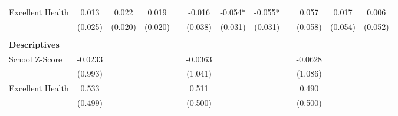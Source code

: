 \begin{table}[htpb!]
\begin{center}
{\begin{tabular}{lcccp{2mm}cccp{2mm}ccc}
Excellent Health&0.013&0.022&0.019&&-0.016&-0.054*&-0.055*&&0.057&0.017&0.006\\
&(0.025)&(0.020)&(0.020)&&(0.038)&(0.031)&(0.031)&&(0.058)&(0.054)&(0.052)\\
\begin{footnotesize}\end{footnotesize}&\begin{footnotesize}\end{footnotesize}&\begin{footnotesize}\end{footnotesize}&\begin{footnotesize}\end{footnotesize}&\begin{footnotesize}\end{footnotesize}&\begin{footnotesize}\end{footnotesize}&\begin{footnotesize}\end{footnotesize}&\begin{footnotesize}\end{footnotesize}&\begin{footnotesize}\end{footnotesize}&\begin{footnotesize}\end{footnotesize}&\begin{footnotesize}\end{footnotesize}&\begin{footnotesize}\end{footnotesize}\\
\multicolumn{12}{l}{\textbf{Descriptives}}\\ 
School Z-Score&-0.0233&&&&-0.0363&&&&-0.0628&&\\
&(0.993)&&&&(1.041)&&&&(1.086)&&\\
Excellent Health&0.533&&&&0.511&&&&0.490&&\\
&(0.499)&&&&(0.500)&&&&(0.500)&&\\

\end{tabular}}
\end{center}
\end{table}
